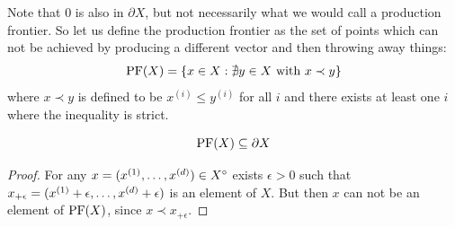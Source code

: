 Note that \(0\) is also in \(\partial X\), but not necessarily what we would
call a production frontier. So let us define the production frontier as the set
of points which can not be achieved by producing a different vector and then
throwing away things:
\[
	\operatorname{PF}(X) = \{ x\in X : \nexists y\in X \text{ with } x\prec y\}
\]
where \(x\prec y\) is defined to be \(x^{(i)} \le y^{(i)}\) for all \(i\) and
there exists at least one \(i\) where the inequality is strict.

\begin{lemma}
	\label{lem: prod frontier part of boundary}
	\[
		\operatorname{PF}(X)\subseteq \partial X
	\]
\end{lemma}
\begin{proof}
	For any \(x=(x^{(1)},\dots, x^{(d)})\in X^\circ\) exists \(\epsilon>0\)
	such that \(x_{+\epsilon} = (x^{(1)}+\epsilon, \dots, x^{(d)}+\epsilon)\)
	is an element of \(X\). But then \(x\) can not be an element of \(\operatorname{PF}(X)\),
	since \(x \prec x_{+\epsilon}\).
\end{proof}

